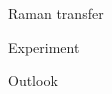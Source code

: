 \documentclass{beamer}
\begin{document}
\begin{frame}{Raman transfer}
\end{frame}



\begin{frame}{Experiment}
\end{frame}


\begin{frame}{Outlook}
\end{frame}

\begin{frame}{}
\end{frame}
\end{document}

